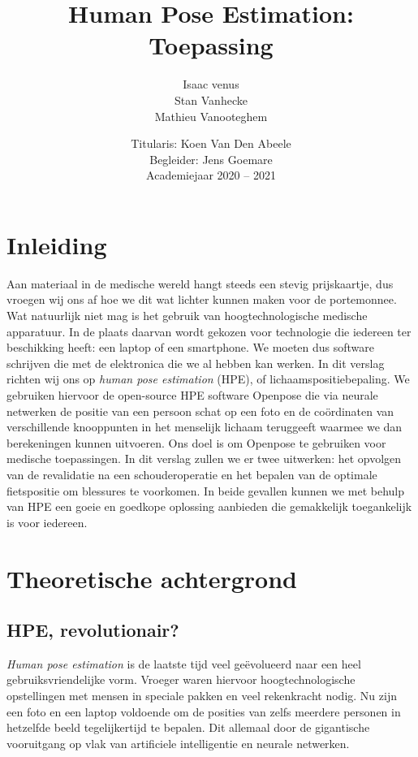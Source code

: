 \documentclass[a4paper,twoside,kulak]{kulakreport}
\title{Human Pose Estimation:\\Toepassing}
\subtitle{}
\author{Isaac venus\\Stan Vanhecke\\Mathieu Vanooteghem}
\institute{KU Leuven Kulak, Wetenschap \& Technologie}
\date{Titularis: Koen Van Den Abeele\\Begleider: Jens Goemare\\Academiejaar 2020 -- 2021}
\begin{document}

\titlepage

\tableofcontents

\chapter*{Inleiding}
Aan materiaal in de medische wereld hangt steeds een stevig prijskaartje, dus vroegen wij ons af hoe we dit wat lichter kunnen maken voor de portemonnee. Wat natuurlijk niet mag is het gebruik van hoogtechnologische medische apparatuur. In de plaats daarvan wordt gekozen voor technologie die iedereen ter beschikking heeft: een laptop of een smartphone. We moeten dus software schrijven die met de elektronica die we al hebben kan werken. In dit verslag richten wij ons op \emph{human pose estimation} (HPE), of lichaamspositiebepaling. We gebruiken hiervoor de open-source HPE software Openpose die via neurale netwerken de positie van een persoon schat op een foto en de coördinaten van verschillende knooppunten in het menselijk lichaam teruggeeft waarmee we dan berekeningen kunnen uitvoeren. Ons doel is om Openpose te gebruiken voor medische toepassingen. In dit verslag zullen we er twee uitwerken: het opvolgen van de revalidatie na een schouderoperatie en het bepalen van de optimale fietspositie om blessures te voorkomen. In beide gevallen kunnen we met behulp van HPE een goeie en goedkope oplossing aanbieden die gemakkelijk toegankelijk is voor iedereen.

\chapter{Theoretische achtergrond}
\section{HPE, revolutionair?}
\emph{Human pose estimation} is de laatste tijd veel geëvolueerd naar een heel gebruiksvriendelijke vorm. Vroeger waren hiervoor hoogtechnologische opstellingen met mensen in speciale pakken en veel rekenkracht nodig. Nu zijn een foto en een laptop voldoende om de posities van zelfs meerdere personen in hetzelfde beeld tegelijkertijd te bepalen. Dit allemaal door de gigantische vooruitgang op vlak van artificiele intelligentie en neurale netwerken.
\end{document}
